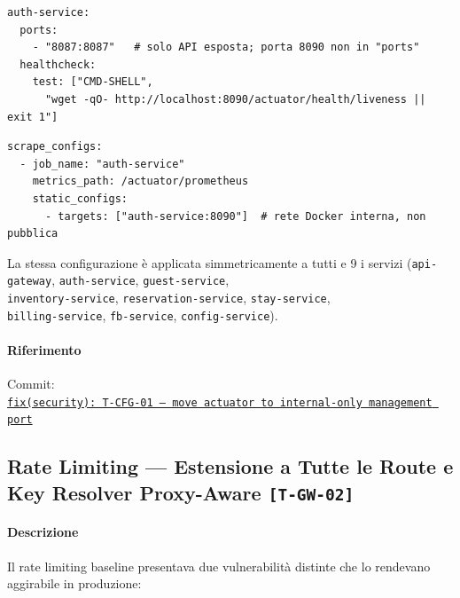 ﻿\documentclass[a4paper,12pt]{report}
\newcommand{\commitref}[2]{\texttt{\small \href{https://github.com/diegoandruccioli/hotel-pms/commit/#1}{#2}}}
\newcommand{\threat}[1]{\texttt{\small\textcolor{vulnred}{[#1]}}}
\begin{document}
\begin{securebox}[title={docker-compose.yml (post-hardening) --- porta management non pubblicata}]
\begin{lstlisting}[style=yaml]
auth-service:
  ports:
    - "8087:8087"   # solo API esposta; porta 8090 non in "ports"
  healthcheck:
    test: ["CMD-SHELL",
      "wget -qO- http://localhost:8090/actuator/health/liveness || exit 1"]
\end{lstlisting}
\end{securebox}

\begin{securebox}[title={docker/prometheus/prometheus.yml --- scraping su porta interna}]
\begin{lstlisting}[style=yaml]
scrape_configs:
  - job_name: "auth-service"
    metrics_path: /actuator/prometheus
    static_configs:
      - targets: ["auth-service:8090"]  # rete Docker interna, non pubblica
\end{lstlisting}
\end{securebox}

La stessa configurazione è applicata simmetricamente a tutti e 9 i servizi
(\texttt{api-gateway}, \texttt{auth-service}, \texttt{guest-service},\\
\texttt{inventory-service}, \texttt{reservation-service}, \texttt{stay-service},\\
\texttt{billing-service}, \texttt{fb-service}, \texttt{config-service}).

\paragraph{Riferimento} Commit:\\
\commitref{b0cf898}{fix(security): T-CFG-01 --- move actuator to internal-only management port}

\subsection{Rate Limiting — Estensione a Tutte le Route e Key Resolver Proxy-Aware \threat{T-GW-02}}

\paragraph{Descrizione}
Il rate limiting baseline presentava due vulnerabilità distinte che lo rendevano aggirabile
in produzione:
\end{document}

